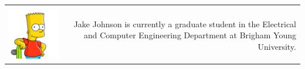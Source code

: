 \begin{tabular}{l|r}
\begin{minipage}{0.75\linewidth}
\end{minipage} \\	
%
\includegraphics[width=.25\linewidth]{contributors/jake_johnson} & 
\begin{minipage}{0.75\linewidth}
	Jake Johnson is currently a graduate student in the Electrical and Computer Engineering Department at Brigham Young University.
\end{minipage} \\	
	

\end{tabular}
